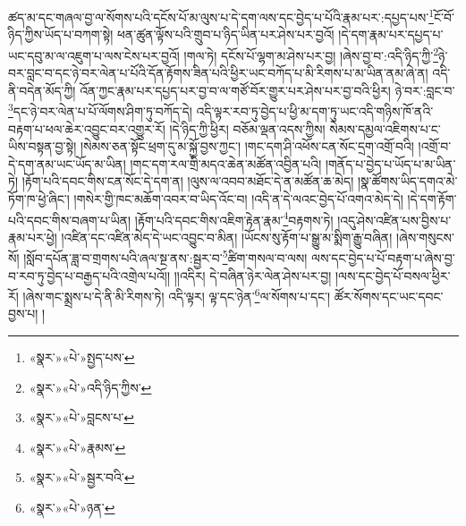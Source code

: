 ཚད་མ་དང་གཞལ་བྱ་ལ་སོགས་པའི་དངོས་པོ་མ་ལུས་པ་དེ་དག་ལས་དང་བྱེད་པ་པོའི་རྣམ་པར་:དཔྱད་པས་\footnote{«སྣར་»«པེ་»སྤྱད་པས་}ངོ་བོ་ཉིད་ཀྱིས་ཡོད་པ་བཀག་སྟེ། ཕན་ཚུན་ལྟོས་པའི་གྲུབ་པ་ཉིད་ཡིན་པར་ཤེས་པར་བྱའོ། །དེ་དག་རྣམ་པར་དཔྱད་པ་ཡང་དབུ་མ་ལ་འཇུག་པ་ལས་ངེས་པར་བྱའོ། །གལ་ཏེ། དངོས་པོ་ལྷག་མ་ཤེས་པར་བྱ། །ཞེས་བྱ་བ་:འདི་ཉིད་ཀྱི་\footnote{«སྣར་»«པེ་»འདི་ཉིད་ཀྱིས་}ཉེ་བར་བླང་བ་དང་ཉེ་བར་ལེན་པ་པོའི་དོན་རྟོགས་ཟིན་པའི་ཕྱིར་ཡང་བཀོད་པ་མི་རིགས་པ་མ་ཡིན་ནམ་ཞེ་ན། འདི་ནི་བདེན་མོད་ཀྱི། འོན་ཀྱང་རྣམ་པར་དཔྱད་པར་བྱ་བ་ལ་གཙོ་བོར་གྱུར་པར་ཤེས་པར་བྱ་བའི་ཕྱིར། ཉེ་བར་:བླང་བ་\footnote{«སྣར་»«པེ་»བླངས་པ་}དང་ཉེ་བར་ལེན་པ་པོ་ལོགས་ཤིག་ཏུ་བཀོད་དེ། འདི་ལྟར་རབ་ཏུ་བྱེད་པ་ཕྱི་མ་དག་ཏུ་ཡང་འདི་གཉིས་ཁོ་ནའི་བརྟག་པ་ཕལ་ཆེར་འབྱུང་བར་འགྱུར་རོ། །དེ་ཉིད་ཀྱི་ཕྱིར། བཅོམ་ལྡན་འདས་ཀྱིས། སེམས་དམྱལ་འཇིགས་པ་ང་ཡིས་བསྟན་བྱ་སྟེ། །སེམས་ཅན་སྟོང་ཕྲག་དུ་མ་སྐྱོ་བྱས་ཀྱང་། །གང་དག་ཤི་འཕོས་ངན་སོང་དྲག་འགྲོ་བའི། །འགྲོ་བ་དེ་དག་ནམ་ཡང་ཡོད་མ་ཡིན། །གང་དག་རལ་གྲི་མདའ་ཆེན་མཚོན་འབྱིན་པའི། །གནོད་པ་བྱེད་པ་ཡོད་པ་མ་ཡིན་ཏེ། །རྟོག་པའི་དབང་གིས་ངན་སོང་དེ་དག་ན། །ལུས་ལ་འབབ་མཐོང་དེ་ན་མཚོན་ཆ་མེད། །སྣ་ཚོགས་ཡིད་དགའ་མེ་ཏོག་ཁ་ཕྱེ་ཞིང་། །གསེར་གྱི་ཁང་མཆོག་འབར་བ་ཡིད་འོང་བ། །འདི་ན་དེ་ལའང་བྱེད་པོ་འགའ་མེད་དེ། །དེ་དག་རྟོག་པའི་དབང་གིས་བཞག་པ་ཡིན། །རྟོག་པའི་དབང་གིས་འཇིག་རྟེན་རྣམ་\footnote{«སྣར་»«པེ་»རྣམས་}བརྟགས་ཏེ། །འདུ་ཤེས་འཛིན་པས་བྱིས་པ་རྣམ་པར་ཕྱེ། །འཛིན་དང་འཛིན་མེད་དེ་ཡང་འབྱུང་བ་མིན། །ཡོངས་སུ་རྟོག་པ་སྒྱུ་མ་སྨིག་རྒྱུ་བཞིན། །ཞེས་གསུངས་སོ། །སློབ་དཔོན་ཟླ་བ་གྲགས་པའི་ཞལ་སྔ་ནས་:སྦྱར་བ་\footnote{«སྣར་»«པེ་»སྦྱར་བའི་}ཚིག་གསལ་བ་ལས། ལས་དང་བྱེད་པ་པོ་བརྟག་པ་ཞེས་བྱ་བ་རབ་ཏུ་བྱེད་པ་བརྒྱད་པའི་འགྲེལ་པའོ།། །།འདིར། དེ་བཞིན་ཉེར་ལེན་ཤེས་པར་བྱ། །ལས་དང་བྱེད་པོ་བསལ་ཕྱིར་རོ། །ཞེས་གང་སྨྲས་པ་དེ་ནི་མི་རིགས་ཏེ། འདི་ལྟར། ལྟ་དང་ཉེན་\footnote{«སྣར་»«པེ་»ཉན་}ལ་སོགས་པ་དང་། ཚོར་སོགས་དང་ཡང་དབང་བྱས་པ། །
